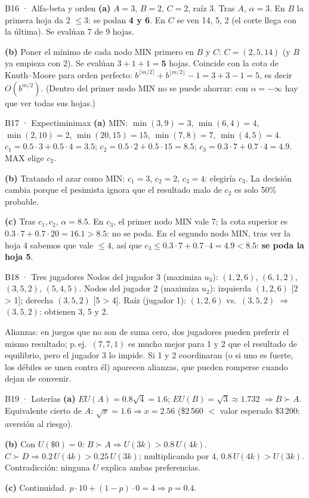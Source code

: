\begin{solucion}{B16 · Alfa-beta y orden}
\textbf{(a)} $A=3$, $B=2$, $C=2$, raíz 3. Tras $A$, $\alpha=3$. En $B$ la primera hoja da 2 $\le3$: se podan
\textbf{4 y 6}. En $C$ se ven 14, 5, 2 (el corte llega con la última). Se evalúan 7 de 9 hojas.

\textbf{(b)} Poner el mínimo de cada nodo MIN primero en $B$ y $C$: $C=(2,5,14)$ (y $B$ ya empieza con 2).
Se evalúan $3+1+1=\mathbf{5}$ hojas. Coincide con la cota de Knuth–Moore para orden perfecto:
$b^{\lceil m/2\rceil}+b^{\lfloor m/2\rfloor}-1=3+3-1=5$, es decir $O(b^{m/2})$. (Dentro del primer nodo MIN
no se puede ahorrar: con $\alpha=-\infty$ hay que ver todas sus hojas.)
\end{solucion}

\begin{solucion}{B17 · Expectiminimax}
\textbf{(a)} MIN: $\min(3,9)=3$, $\min(6,4)=4$, $\min(2,10)=2$, $\min(20,15)=15$, $\min(7,8)=7$, $\min(4,5)=4$.
$c_1=0.5\cdot3+0.5\cdot4=3.5$; $c_2=0.5\cdot2+0.5\cdot15=\mathbf{8.5}$; $c_3=0.3\cdot7+0.7\cdot4=4.9$. MAX elige $c_2$.

\textbf{(b)} Tratando el azar como MIN: $c_1=3$, $c_2=2$, $c_3=4$: elegiría $c_3$. La decisión cambia porque
el pesimista ignora que el resultado malo de $c_2$ es solo 50\% probable.

\textbf{(c)} Tras $c_1,c_2$, $\alpha=8.5$. En $c_3$, el primer nodo MIN vale 7; la cota superior es
$0.3\cdot7+0.7\cdot20=16.1>8.5$: no se poda. En el segundo nodo MIN, tras ver la hoja 4 sabemos que
vale $\le4$, así que $c_3\le0.3\cdot7+0.7\cdot4=4.9<8.5$: \textbf{se poda la hoja 5}.
\end{solucion}

\begin{solucion}{B18 · Tres jugadores}
Nodos del jugador 3 (maximiza $u_3$): $(1,2,6)$, $(6,1,2)$, $(3,5,2)$, $(5,4,5)$.
Nodos del jugador 2 (maximiza $u_2$): izquierda $(1,2,6)$ [2 > 1]; derecha $(3,5,2)$ [5 > 4].
Raíz (jugador 1): $(1,2,6)$ vs.\ $(3,5,2)$ $\Rightarrow$ \textbf{$(3,5,2)$}: obtienen 3, 5 y 2.

Alianzas: en juegos que no son de suma cero, dos jugadores pueden preferir el mismo resultado; p.\,ej.\
$(7,7,1)$ es mucho mejor para 1 y 2 que el resultado de equilibrio, pero el jugador 3 lo impide. Si 1 y 2
coordinaran (o si uno es fuerte, los débiles se unen contra él) aparecen alianzas, que pueden romperse
cuando dejan de convenir.
\end{solucion}

\begin{solucion}{B19 · Loterías}
\textbf{(a)} $EU(A)=0.8\sqrt4=1.6$; $EU(B)=\sqrt3\approx1.732$ $\Rightarrow B\succ A$. Equivalente cierto de $A$:
$\sqrt x=1.6\Rightarrow x=2.56$ (\$2\,560 $<$ valor esperado \$3\,200: aversión al riesgo).

\textbf{(b)} Con $U(\$0)=0$: $B\succ A\Rightarrow U(3k)>0.8\,U(4k)$. $C\succ D\Rightarrow0.2\,U(4k)>0.25\,U(3k)$;
multiplicando por 4, $0.8\,U(4k)>U(3k)$. Contradicción: ninguna $U$ explica ambas preferencias.

\textbf{(c)} Continuidad. $p\cdot10+(1-p)\cdot0=4\Rightarrow p=0.4$.
\end{solucion}

